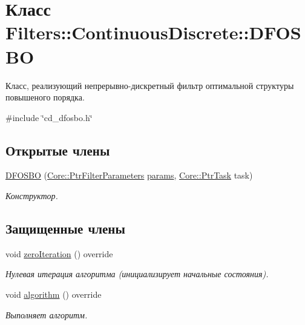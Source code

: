 \hypertarget{class_filters_1_1_continuous_discrete_1_1_d_f_o_s_b_o}{}\section{Класс Filters\+:\+:Continuous\+Discrete\+:\+:D\+F\+O\+S\+BO}
\label{class_filters_1_1_continuous_discrete_1_1_d_f_o_s_b_o}


Класс, реализующий непрерывно-\/дискретный фильтр оптимальной структуры повышеного порядка.  




{\ttfamily \#include \char`\"{}cd\+\_\+dfosbo.\+h\char`\"{}}

\subsection*{Открытые члены}
\begin{DoxyCompactItemize}
\item 
\hyperlink{class_filters_1_1_continuous_discrete_1_1_d_f_o_s_b_o_acadfa83ce71342e673d5cf954bda3cdc}{D\+F\+O\+S\+BO} (\hyperlink{namespace_core_a4811af8148ba137d644b9a61a042cf03}{Core\+::\+Ptr\+Filter\+Parameters} \hyperlink{class_core_1_1_filter_a44aa749b49ba46256975ce545531ecf7}{params}, \hyperlink{namespace_core_abfda8f69fcacfcea2696549b548ed737}{Core\+::\+Ptr\+Task} task)\hypertarget{class_filters_1_1_continuous_discrete_1_1_d_f_o_s_b_o_acadfa83ce71342e673d5cf954bda3cdc}{}\label{class_filters_1_1_continuous_discrete_1_1_d_f_o_s_b_o_acadfa83ce71342e673d5cf954bda3cdc}

\begin{DoxyCompactList}\small\item\em Конструктор. \end{DoxyCompactList}\end{DoxyCompactItemize}
\subsection*{Защищенные члены}
\begin{DoxyCompactItemize}
\item 
void \hyperlink{class_filters_1_1_continuous_discrete_1_1_d_f_o_s_b_o_a958c75df5031558a244d553f13376e75}{zero\+Iteration} () override
\begin{DoxyCompactList}\small\item\em Нулевая итерация алгоритма (инициализирует начальные состояния). \end{DoxyCompactList}\item 
void \hyperlink{class_filters_1_1_continuous_discrete_1_1_d_f_o_s_b_o_ab911983ab9ff8e22dc68e33fdb4601b6}{algorithm} () override
\begin{DoxyCompactList}\small\item\em Выполняет алгоритм. \end{DoxyCompactList}\end{DoxyCompactItemize}
